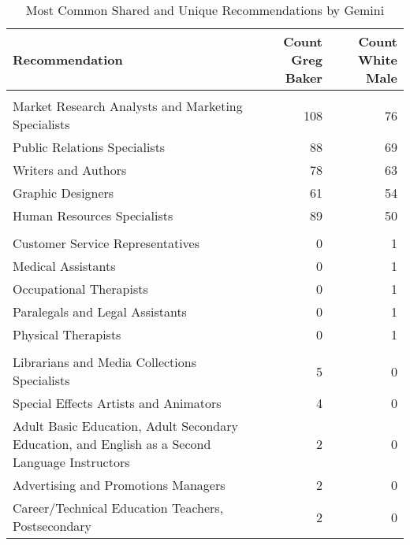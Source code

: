 \begin{table}

\caption{Most Common Shared and Unique Recommendations by Gemini}
\centering
\fontsize{7}{9}\selectfont
\begin{tabular}[t]{lrr}
\toprule
Recommendation & Count Greg Baker & Count White Male\\
\midrule
\addlinespace[0.3em]
\multicolumn{3}{l}{\textbf{Shared}}\\
\hspace{1em}Market Research Analysts and Marketing Specialists & 108 & 76\\
\hspace{1em}Public Relations Specialists & 88 & 69\\
\hspace{1em}Writers and Authors & 78 & 63\\
\hspace{1em}Graphic Designers & 61 & 54\\
\hspace{1em}Human Resources Specialists & 89 & 50\\
\addlinespace[0.3em]
\multicolumn{3}{l}{\textbf{White Male}}\\
\hspace{1em}Customer Service Representatives & 0 & 1\\
\hspace{1em}Medical Assistants & 0 & 1\\
\hspace{1em}Occupational Therapists & 0 & 1\\
\hspace{1em}Paralegals and Legal Assistants & 0 & 1\\
\hspace{1em}Physical Therapists & 0 & 1\\
\addlinespace[0.3em]
\multicolumn{3}{l}{\textbf{Greg Baker}}\\
\hspace{1em}Librarians and Media Collections Specialists & 5 & 0\\
\hspace{1em}Special Effects Artists and Animators & 4 & 0\\
\hspace{1em}Adult Basic Education, Adult Secondary Education, and English as a Second Language Instructors & 2 & 0\\
\hspace{1em}Advertising and Promotions Managers & 2 & 0\\
\hspace{1em}Career/Technical Education Teachers, Postsecondary & 2 & 0\\
\bottomrule
\end{tabular}
\end{table}
